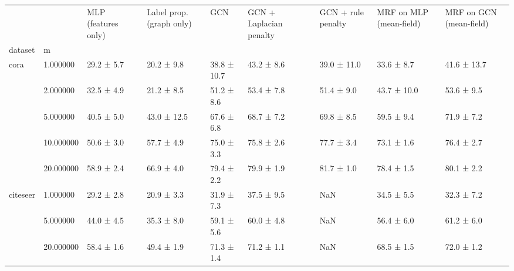 \begin{tabular}{lllllllll}
\toprule
 &  & MLP (features only) & Label prop. (graph only) & GCN & GCN + Laplacian penalty & GCN + rule penalty & MRF on MLP (mean-field) & MRF on GCN (mean-field) \\
dataset & m &  &  &  &  &  &  &  \\
\midrule
\multirow[t]{5}{*}{cora} & 1.000000 & 29.2 ± 5.7 & 20.2 ± 9.8 & 38.8 ± 10.7 & 43.2 ± 8.6 & 39.0 ± 11.0 & 33.6 ± 8.7 & 41.6 ± 13.7 \\
 & 2.000000 & 32.5 ± 4.9 & 21.2 ± 8.5 & 51.2 ± 8.6 & 53.4 ± 7.8 & 51.4 ± 9.0 & 43.7 ± 10.0 & 53.6 ± 9.5 \\
 & 5.000000 & 40.5 ± 5.0 & 43.0 ± 12.5 & 67.6 ± 6.8 & 68.7 ± 7.2 & 69.8 ± 8.5 & 59.5 ± 9.4 & 71.9 ± 7.2 \\
 & 10.000000 & 50.6 ± 3.0 & 57.7 ± 4.9 & 75.0 ± 3.3 & 75.8 ± 2.6 & 77.7 ± 3.4 & 73.1 ± 1.6 & 76.4 ± 2.7 \\
 & 20.000000 & 58.9 ± 2.4 & 66.9 ± 4.0 & 79.4 ± 2.2 & 79.9 ± 1.9 & 81.7 ± 1.0 & 78.4 ± 1.5 & 80.1 ± 2.2 \\
\cline{1-9}
\multirow[t]{3}{*}{citeseer} & 1.000000 & 29.2 ± 2.8 & 20.9 ± 3.3 & 31.9 ± 7.3 & 37.5 ± 9.5 & NaN & 34.5 ± 5.5 & 32.3 ± 7.2 \\
 & 5.000000 & 44.0 ± 4.5 & 35.3 ± 8.0 & 59.1 ± 5.6 & 60.0 ± 4.8 & NaN & 56.4 ± 6.0 & 61.2 ± 6.0 \\
 & 20.000000 & 58.4 ± 1.6 & 49.4 ± 1.9 & 71.3 ± 1.4 & 71.2 ± 1.1 & NaN & 68.5 ± 1.5 & 72.0 ± 1.2 \\
\cline{1-9}
\bottomrule
\end{tabular}
